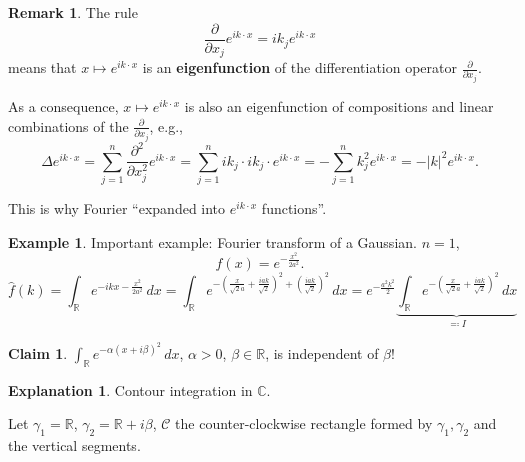 \documentclass[12pt]{article}
\theoremstyle{definition}
\newtheorem*{claim*}{Claim}
\newtheorem*{remark}{Remark}
\newtheorem{explanation}{Explanation}
\newtheorem*{example*}{Example}
\begin{document}
\begin{remark}
The rule
\[\frac{\partial}{\partial x_j}e^{ik\cdot x}=ik_je^{ik\cdot x}\]
means that $x\mapsto e^{ik\cdot x}$ is an \textbf{eigenfunction} of the differentiation operator $\frac{\partial}{\partial x_j}$.

As a consequence, $x\mapsto e^{ik\cdot x}$ is also an eigenfunction of compositions and linear combinations of the $\frac{\partial}{\partial x_j}$, e.g.,
\[\Delta e^{ik\cdot x}=\sum_{j=1}^n\frac{\partial^2}{\partial x_j^2}e^{ik\cdot x}=\sum_{j=1}^nik_j\cdot ik_j\cdot e^{ik\cdot x}=-\sum_{j=1}^nk_j^2e^{ik\cdot x}=-|k|^2e^{ik\cdot x}.\]

This is why Fourier ``expanded into $e^{ik\cdot x}$ functions''.
\end{remark}

\begin{example*}
Important example: Fourier transform of a Gaussian. $n=1$,
\[f(x)=e^{-\frac{x^2}{2a^2}}.\]
\[\hat{f}(k)=\int_{\mathbb{R}}e^{-ikx-\frac{x^2}{2a^2}}\,dx=\int_{\mathbb{R}}e^{-\left(\frac{x}{\sqrt{2}a}+\frac{iak}{\sqrt{2}}\right)^2+\left(\frac{iak}{\sqrt{2}}\right)^2}\,dx=e^{-\frac{a^2k^2}{2}}\underbrace{\int_{\mathbb{R}}e^{-\left(\frac{x}{\sqrt{2}a}+\frac{iak}{\sqrt{2}}\right)^2}\,dx}_{\eqqcolon I}\]

\begin{claim*}
$\int_{\mathbb{R}}e^{-\alpha(x+i\beta)^2}\,dx$, $\alpha>0$, $\beta\in\mathbb{R}$, is independent of $\beta$!
\end{claim*}

\begin{explanation}
Contour integration in $\mathbb{C}$.

\begin{center}
\end{center}

Let $\gamma_1=\mathbb{R}$, $\gamma_2=\mathbb{R}+i\beta$, $\mathcal{C}$ the counter-clockwise rectangle formed by $\gamma_1,\gamma_2$ and the vertical segments.


\end{explanation}
\end{example*}
\end{document}
